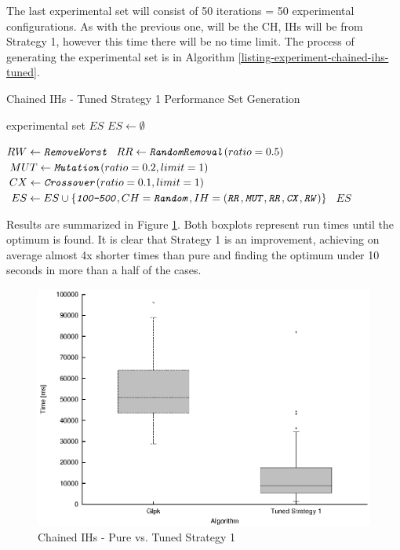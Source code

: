 The last experimental set will consist of 50 iterations = 50 experimental configurations. As with the previous one,  will be the CH, IHs will be from Strategy 1, however this time there will be no time limit. The process of generating the experimental set is in Algorithm \ref{listing-experiment-chained-ihs-tuned}.

\begin{algorithm}
\caption{Chained IHs - Tuned Strategy 1 Performance Set Generation}
\label{listing-experiment-chained-ihs-tuned}
\begin{algorithmic}
\ENSURE experimental set $ES$
\STATE $ES \gets \emptyset$

\STATE $RW \gets \texttt{\textit{RemoveWorst}}$
\STATE $RR \gets \texttt{\textit{RandomRemoval}}(ratio = 0.5)$
\STATE $MUT \gets \texttt{\textit{Mutation}}(ratio = 0.2, limit = 1)$
\STATE $CX \gets \texttt{\textit{Crossover}}(ratio = 0.1, limit = 1)$
  \STATE $ES \gets ES \cup \{\texttt{\textit{100-500}}, CH = \texttt{\textit{Random}}, IH = (\texttt{\textit{RR}}, \texttt{\textit{MUT}}, \texttt{\textit{RR}}, \texttt{\textit{CX}}, \texttt{\textit{RW}})\}$
\ENDFOR
\RETURN $ES$
\end{algorithmic}
\end{algorithm}

Results are summarized in Figure \ref{image-experiment-chained-ihs-tuned}. Both boxplots represent run times until the optimum is found. It is clear that Strategy 1 is an improvement, achieving on average almost 4x shorter times than pure  and finding the optimum under 10 seconds in more than a half of the cases.

\begin{figure}
  \caption{Chained IHs - Pure  vs. Tuned Strategy 1}
  \label{image-experiment-chained-ihs-tuned}
  \centering
    \includegraphics[width=\textwidth]{images/experiments/chained-ihs-tuned}
\end{figure}


